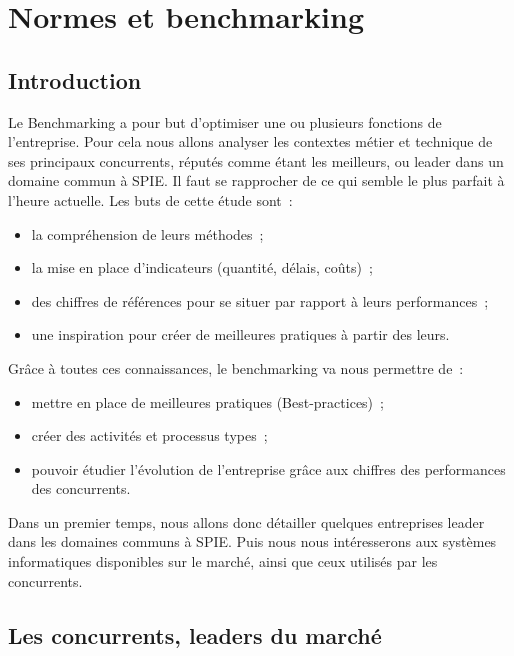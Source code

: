 \chapter{Normes et benchmarking}


\section{Introduction}
	Le Benchmarking a pour but d'optimiser une ou plusieurs fonctions de l'entreprise. Pour cela nous allons analyser les contextes métier et technique de ses principaux concurrents, réputés comme étant les meilleurs, ou leader dans un domaine commun à SPIE. Il faut se rapprocher de ce qui semble le plus parfait à l'heure actuelle.
	Les buts de cette étude sont~:
    \begin{itemize}
    	\item la compréhension de leurs méthodes~;
    	\item la mise en place d'indicateurs (quantité, délais, coûts)~;
    	\item des chiffres de références pour se situer par rapport à leurs performances~;
    	\item une inspiration pour créer de meilleures pratiques à partir des leurs.
    \end{itemize}
    \bigbreak
	Grâce à toutes ces connaissances, le benchmarking va nous permettre de~:
    \begin{itemize}
    	\item mettre en place de meilleures pratiques (Best-practices)~;
    	\item créer des activités et processus types~;
    	\item pouvoir étudier l'évolution de l'entreprise grâce aux chiffres des performances des concurrents.
    \end{itemize}
    \bigbreak
	Dans un premier temps, nous allons donc détailler quelques entreprises leader dans les domaines communs à SPIE. Puis nous nous intéresserons aux systèmes informatiques disponibles sur le marché, ainsi que ceux utilisés par les concurrents.

\section{Les concurrents, leaders du marché}
